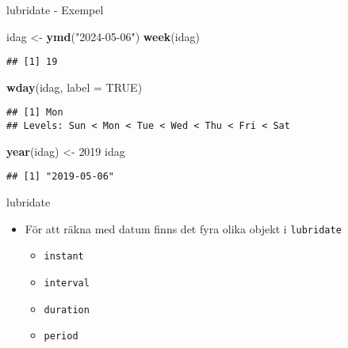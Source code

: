 \documentclass[
  11pt,
  ignorenonframetext,
  handout]{beamer}
\newenvironment{Shaded}{\begin{snugshade}}{\end{snugshade}}
\newcommand{\AttributeTok}[1]{\textcolor[rgb]{0.13,0.29,0.53}{#1}}
\newcommand{\ConstantTok}[1]{\textcolor[rgb]{0.56,0.35,0.01}{#1}}
\newcommand{\DecValTok}[1]{\textcolor[rgb]{0.00,0.00,0.81}{#1}}
\newcommand{\FunctionTok}[1]{\textcolor[rgb]{0.13,0.29,0.53}{\textbf{#1}}}
\newcommand{\NormalTok}[1]{#1}
\newcommand{\OtherTok}[1]{\textcolor[rgb]{0.56,0.35,0.01}{#1}}
\newcommand{\StringTok}[1]{\textcolor[rgb]{0.31,0.60,0.02}{#1}}
\providecommand{\tightlist}{%
  \setlength{\itemsep}{0pt}\setlength{\parskip}{0pt}}
\begin{document}
\begin{frame}[fragile]{lubridate - Exempel}
\label{lubridate---exempel-1}
\begin{Shaded}
\begin{Highlighting}[]
\NormalTok{idag }\OtherTok{\textless{}{-}} \FunctionTok{ymd}\NormalTok{(}\StringTok{"2024{-}05{-}06"}\NormalTok{)}
\FunctionTok{week}\NormalTok{(idag)}
\end{Highlighting}
\end{Shaded}

\begin{verbatim}
## [1] 19
\end{verbatim}

\begin{Shaded}
\begin{Highlighting}[]
\FunctionTok{wday}\NormalTok{(idag, }\AttributeTok{label =} \ConstantTok{TRUE}\NormalTok{)}
\end{Highlighting}
\end{Shaded}

\begin{verbatim}
## [1] Mon
## Levels: Sun < Mon < Tue < Wed < Thu < Fri < Sat
\end{verbatim}

\begin{Shaded}
\begin{Highlighting}[]
\FunctionTok{year}\NormalTok{(idag) }\OtherTok{\textless{}{-}} \DecValTok{2019}
\NormalTok{idag}
\end{Highlighting}
\end{Shaded}

\begin{verbatim}
## [1] "2019-05-06"
\end{verbatim}
\end{frame}

\begin{frame}{lubridate}
\label{lubridate-3}
\begin{itemize}
\tightlist
\item
  För att räkna med datum finns det fyra olika objekt i
  \texttt{lubridate}

  \begin{itemize}
  \tightlist
  \item
    \texttt{instant}
  \item
    \texttt{interval}
  \item
    \texttt{duration}
  \item
    \texttt{period}
  \end{itemize}
\end{itemize}
\end{frame}
\end{document}

